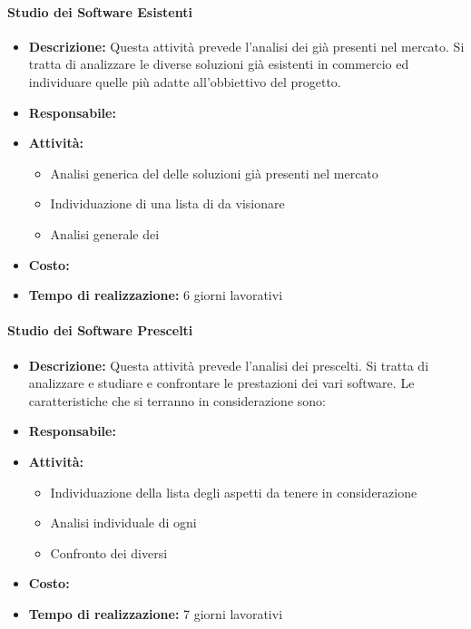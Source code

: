 \paragraph{Studio dei Software Esistenti }
\begin{itemize}
\item{\bfseries Descrizione:} Questa attività prevede l'analisi dei  già presenti nel mercato. Si tratta di analizzare le diverse soluzioni già esistenti in commercio ed individuare quelle più adatte all'obbiettivo del progetto. 

\item {\bfseries Responsabile:}
\item  {\bfseries Attività:}
		\begin{itemize}
		\item Analisi generica del delle soluzioni  già presenti nel mercato
		\item Individuazione di una lista di  da visionare
		\item Analisi generale dei 
		\end{itemize}

\item  {\bfseries Costo:}
\item  {\bfseries Tempo di realizzazione:} 6 giorni lavorativi
\end{itemize}

\paragraph{Studio dei Software Prescelti}
\begin{itemize}
\item{\bfseries Descrizione:}  Questa attività prevede l'analisi dei  prescelti. Si tratta di analizzare e studiare e confrontare le prestazioni dei vari software. Le caratteristiche che si terranno in considerazione sono:

\item {\bfseries Responsabile:}
\item  {\bfseries Attività:}
\begin{itemize}

		\item Individuazione della lista degli aspetti da tenere in considerazione
		\item Analisi individuale di ogni 
		\item Confronto dei diversi 
		\end{itemize}

\item  {\bfseries Costo:}
\item  {\bfseries Tempo di realizzazione:} 7 giorni lavorativi
\end{itemize}


